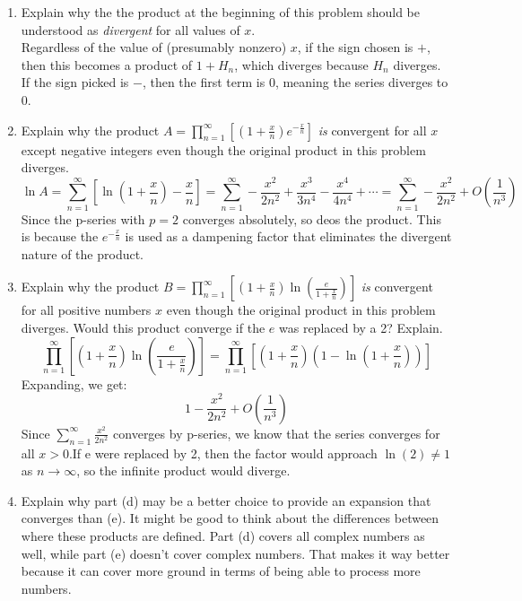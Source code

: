 \documentclass{article}
\begin{document}
\begin{enumerate}
\begin{enumerate}
        \item Explain why the the product at the beginning of this problem should be understood as \textit{divergent} for all values of $x$.\[\]
        Regardless of the value of (presumably nonzero) $x$, if the sign chosen is $+$, then this becomes a product of $1+H_n$, which diverges because $H_n$ diverges. If the sign picked is $-$, then the first term is $0$, meaning the series diverges to 0.
        \[\]
        \item Explain why the product $A=\prod_{n=1}^{\infty} \left[ \left( 1 + \frac x n\right)e^{-\frac x n}\right]$ \textit{is} convergent for all $x$ except negative integers even though the original product in this problem diverges.\[\]
        \[ \ln A = \sum_{n=1}^{\infty} \left[\ln(1 + \frac{x}{n}) - \frac x n\right] = \sum_{n=1}^{\infty} -\frac{x^2}{2n^2} + \frac{x^3}{3n^4} - \frac{x^4}{4n^4} + \cdots = \sum_{n=1}^{\infty} -\frac{x^2}{2n^2} + O\left(\frac 1 {n^3}\right)\]
        Since the p-series with $p = 2$ converges absolutely, so deos the product. This is because the $e^{-\frac x n}$ is used as a dampening factor that eliminates the divergent nature of the product.
        \item Explain why the product $B = \prod_{n=1}^{\infty} \left[ (1 + \frac x n) \ln (\frac{e}{1+ \frac x n })\right]$ \textit{is} convergent for all positive numbers $x$ even though the original product in this problem diverges. Would this product converge if the $e$ was replaced by a 2? Explain.
        \[\]
        \[\prod_{n=1}^{\infty} \left[ (1 + \frac x n) \ln (\frac{e}{1+ \frac x n })\right] = \prod_{n=1}^{\infty} \left[ \left( 1 + \frac x n\right) \left( 1 - \ln (1 + \frac x n)\right)\right]\]
        Expanding, we get:
        \[1 - \frac{x^2}{2n^2} + O(\frac{1}{n^3})\]
        Since $\sum_{n=1}^{\infty} \frac{x^2}{2n^2}$ converges by p-series, we know that the series converges for all $x > 0$.If e were replaced by 2, then the factor would approach $\ln(2) \ne 1$ as $n \to \infty$, so the infinite product would diverge.
        \item Explain why part (d) may be a better choice to provide an expansion that converges than (e). It might be good to think about the differences between where these products are defined.
        \newline \newline Part (d) covers all complex numbers as well, while part (e) doesn't cover complex numbers. That makes it way better because it can cover more ground in terms of being able to process more numbers.
    \end{enumerate}
\end{enumerate}
\end{document}
